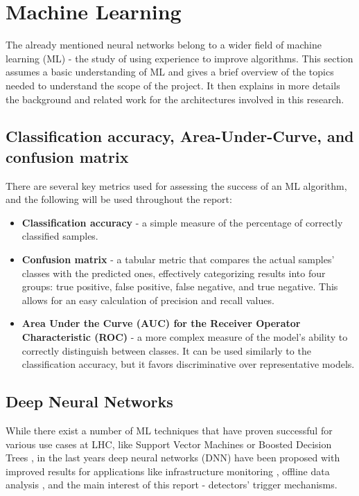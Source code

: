 \section{Machine Learning}
The already mentioned neural networks belong to a wider field of machine learning (ML) - the study of using experience to improve algorithms. This section assumes a basic understanding of ML and gives a brief overview of the topics needed to understand the scope of the project. It then explains in more details the background and related work for the architectures involved in this research.


\subsection{Classification accuracy, Area-Under-Curve, and confusion matrix} \label{ml-accuracy-auc-confusion}
There are several key metrics used for assessing the success of an ML algorithm, and the following will be used throughout the report:

\begin{itemize}
  \item \textbf{Classification accuracy} - a simple measure of the percentage of correctly classified samples.
  \item \textbf{Confusion matrix} - a tabular metric that compares the actual samples' classes with the predicted ones, effectively categorizing results into four groups: true positive, false positive, false negative, and true negative. This allows for an easy calculation of precision and recall values.
  \item \textbf{Area Under the Curve (AUC) for the Receiver Operator Characteristic (ROC)} - a more complex measure of the model's ability to correctly distinguish between classes. It can be used similarly to the classification accuracy, but it favors discriminative over representative models.
\end{itemize}


\subsection{Deep Neural Networks}
While there exist a number of ML techniques that have proven successful for various use cases at LHC, like Support Vector Machines \cite{38-valentino2012classification} or Boosted Decision Trees \cite{pmlr-v42-chen14}, in the last years deep neural networks (DNN) have been proposed with improved results for applications like infrastructure monitoring \cite{39-skoczen2016lstm}, offline data analysis \cite{40-ren2020unveiling}, and the main interest of this report - detectors' trigger mechanisms.

